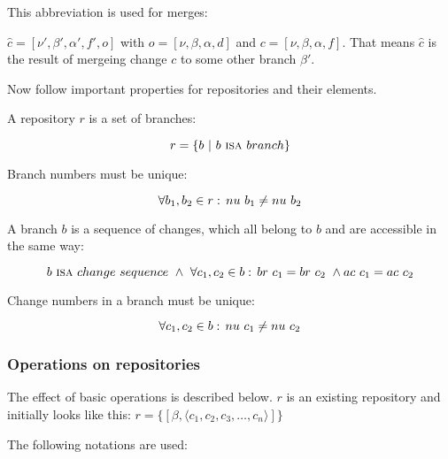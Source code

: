 \documentclass[fleqn, 10pt, a4paper]{report}
\begin{document}
This abbreviation is used for merges:

$\hat c = [\nu', \beta', \alpha', f', o]$ with $o=[\nu, \beta, \alpha, d]$ and
$c=[\nu, \beta, \alpha, f]$. That means $\hat c$ is the result of mergeing
change $c$ to some other branch $\beta'$.

Now follow important properties for repositories and their elements.

A repository $r$ is a set of branches:

\begin{displaymath}
r = \{b \ |\ b\ \mbox{\textsc{isa}}\ \mathnormal{branch}\}
\end{displaymath}

Branch numbers must be unique:

\begin{displaymath}
\forall b_1, b_2 \in r:\, \mathnormal{nu}\ b_1 \neq \mathnormal{nu}\ b_2
\end{displaymath}

A branch $b$ is a sequence of changes, which all belong to
$b$ and are accessible in the same way:

\begin{displaymath}
b\ \mbox{\textsc{isa}}\ \mathnormal{change}\ \mathnormal{sequence}\ \wedge\
\forall c_1, c_2 \in b:\, \mathnormal{br}\ c_1 = \mathnormal{br}\ c_2\ \wedge
\mathnormal{ac}\ c_1 = \mathnormal{ac}\ c_2
\end{displaymath}

Change numbers in a branch must be unique:

\begin{displaymath}
\forall c_1, c_2 \in b:\, \mathnormal{nu}\ c_1 \neq
\mathnormal{nu}\ c_2
\end{displaymath}

\subsubsection{Operations on repositories}

The effect of basic operations is described below. $r$ is an
existing repository and initially looks like this:
$r = \{[\beta, \langle c_1, c_2, c_3, \ldots, c_n\rangle]\}$

The following notations are used:
\end{document}
